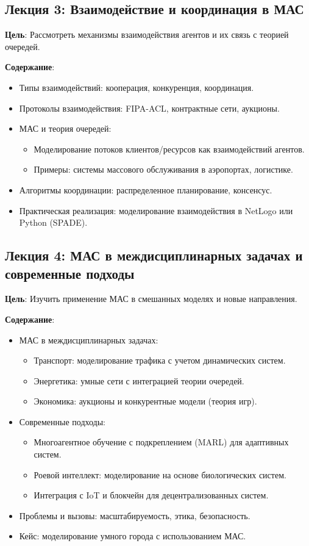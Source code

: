 \subsection*{Лекция 3: Взаимодействие и координация в МАС}
\textbf{Цель}: Рассмотреть механизмы взаимодействия агентов и их связь с теорией очередей.

\textbf{Содержание}:
\begin{itemize}
    \item Типы взаимодействий: кооперация, конкуренция, координация.
    \item Протоколы взаимодействия: FIPA-ACL, контрактные сети, аукционы.
    \item МАС и теория очередей:
    \begin{itemize}
        \item Моделирование потоков клиентов/ресурсов как взаимодействий агентов.
        \item Примеры: системы массового обслуживания в аэропортах, логистике.
    \end{itemize}
    \item Алгоритмы координации: распределенное планирование, консенсус.
    \item Практическая реализация: моделирование взаимодействия в NetLogo или Python (SPADE).
\end{itemize}

\subsection*{Лекция 4: МАС в междисциплинарных задачах и современные подходы}
\textbf{Цель}: Изучить применение МАС в смешанных моделях и новые направления.

\textbf{Содержание}:
\begin{itemize}
    \item МАС в междисциплинарных задачах:
    \begin{itemize}
        \item Транспорт: моделирование трафика с учетом динамических систем.
        \item Энергетика: умные сети с интеграцией теории очередей.
        \item Экономика: аукционы и конкурентные модели (теория игр).
    \end{itemize}
    \item Современные подходы:
    \begin{itemize}
        \item Многоагентное обучение с подкреплением (MARL) для адаптивных систем.
        \item Роевой интеллект: моделирование на основе биологических систем.
        \item Интеграция с IoT и блокчейн для децентрализованных систем.
    \end{itemize}
    \item Проблемы и вызовы: масштабируемость, этика, безопасность.
    \item Кейс: моделирование умного города с использованием МАС.
\end{itemize}